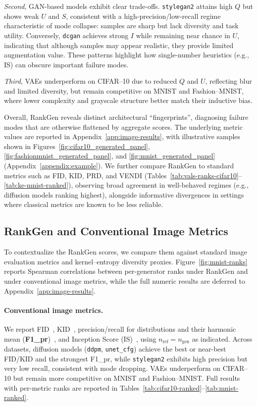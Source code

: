 \textit{Second}, GAN-based models exhibit clear trade-offs.
\texttt{stylegan2} attains high $Q$ but shows weak $U$ and $S$, consistent with a high-precision/low-recall regime
characteristic of mode collapse: samples are sharp but lack diversity and task utility.
Conversely, \texttt{dcgan} achieves strong $I$ while remaining near chance in $U$, indicating that although samples may appear realistic,
they provide limited augmentation value. These patterns highlight how single-number heuristics (e.g., IS)
can obscure important failure modes.

\textit{Third}, VAEs underperform on CIFAR--10 due to reduced $Q$ and $U$, reflecting blur and limited diversity,
but remain competitive on MNIST and Fashion--MNIST, where lower complexity and grayscale structure better match their inductive bias.

Overall, RankGen reveals distinct architectural ``fingerprints'', diagnosing failure modes that are otherwise flattened by aggregate scores.
The underlying metric values are reported in Appendix~\ref{app:image-results}, with illustrative samples shown in
Figures~\ref{fig:cifar10_generated_panel}, \ref{fig:fashionmnist_generated_panel}, and \ref{fig:mnist_generated_panel}
(Appendix~\ref{appendix:example}).
We further compare RankGen to standard metrics such as FID, KID, PRD, and VENDI
(Tables~\ref{tab:vals-ranks-cifar10}--\ref{tab:ke-mnist-ranked}), observing broad agreement in well-behaved regimes
(e.g., diffusion models ranking highest), alongside informative divergences in settings where classical metrics are known to be less reliable.


\subsection{RankGen and Conventional Image Metrics}
\label{sec:rankgen-vs-conventional}

To contextualize the RankGen scores, we compare them against standard image
evaluation metrics and kernel--entropy diversity proxies. Figure~\ref{fig:mnist-ranks}
reports Spearman correlations between per-generator ranks under RankGen and
under conventional image metrics, while the full numeric results are deferred to
Appendix~\ref{app:image-results}.

\paragraph{Conventional image metrics.}
We report FID~\citep{heusel2017gans}, KID~\citep{binkowski2018demystifying},
precision/recall for distributions and their harmonic mean
(\textbf{F1\_pr})~\citep{sajjadi2018assessing,kynkaanniemi2019improved}, and
Inception Score (IS)~\citep{salimans2016improved}, using
$n_{\text{ref}}=n_{\text{gen}}$ as indicated. Across datasets, diffusion models
(\texttt{ddpm}, \texttt{unet\_cfg}) achieve the best or near-best FID/KID and
the strongest F1\_pr, while \texttt{stylegan2} exhibits high precision but very
low recall, consistent with mode dropping. VAEs underperform on CIFAR--10 but
remain more competitive on MNIST and Fashion--MNIST. Full results with
per-metric ranks are reported in
Tables~\ref{tab:cifar10-ranked}--\ref{tab:mnist-ranked}.

